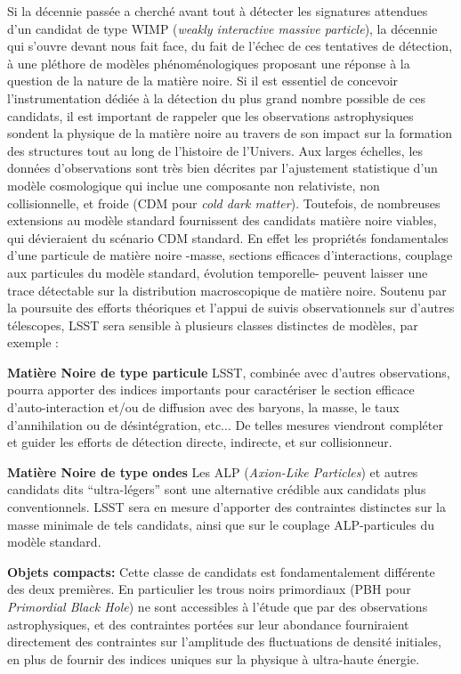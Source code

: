 \documentclass[12pt]{article}
\begin{document}
Si la décennie passée a cherché avant tout à détecter les signatures attendues d'un candidat de type WIMP ({\it weakly interactive massive particle}), la décennie qui s'ouvre devant nous fait face, du fait de l'échec de ces tentatives de détection, à une pléthore de modèles phénoménologiques proposant une réponse à la question de la nature de la matière noire. Si il est essentiel de concevoir l'instrumentation dédiée à la détection du plus grand nombre possible de ces candidats, il est important de rappeler que les observations astrophysiques sondent la physique de la matière noire au travers de son impact sur la formation des structures tout au long de l'histoire de l'Univers. Aux larges échelles, les données d'observations sont très bien décrites par l'ajustement statistique d'un modèle cosmologique qui inclue une composante non relativiste, non collisionnelle, et froide (CDM pour {\it cold dark matter}). Toutefois, de nombreuses extensions au modèle standard fournissent des candidats matière noire viables, qui dévieraient du scénario CDM standard. En effet les propriétés fondamentales d'une particule de matière noire -masse, sections efficaces d'interactions, couplage aux particules du modèle standard, évolution temporelle- peuvent laisser une trace détectable sur la distribution macroscopique de matière noire. Soutenu par la poursuite des efforts théoriques et l'appui de suivis observationnels sur d'autres télescopes, LSST sera sensible à plusieurs classes distinctes de modèles, par exemple :

\noindent \textbf{Matière Noire de type particule} LSST, combinée avec d'autres observations, pourra apporter des indices importants pour caractériser le section efficace d'auto-interaction et/ou de diffusion avec des baryons, la masse, le taux d'annihilation ou de désintégration, etc... De telles mesures viendront compléter et guider les efforts de détection directe, indirecte, et sur collisionneur.

\noindent \textbf{Matière Noire de type ondes} Les ALP ({\it Axion-Like Particles}) et autres candidats dits ``ultra-légers'' sont une alternative crédible aux candidats plus conventionnels. LSST sera en mesure d'apporter des contraintes distinctes sur la masse minimale de tels candidats, ainsi que sur le couplage ALP-particules du modèle standard.

\noindent \textbf{Objets compacts:} Cette classe de candidats est fondamentalement différente des deux premières. En particulier les trous noirs primordiaux (PBH pour {\it Primordial Black Hole}) ne sont accessibles à l'étude que par des observations astrophysiques, et des contraintes portées sur leur abondance fourniraient directement des contraintes sur l'amplitude des fluctuations de densité initiales, en plus de fournir des indices uniques sur la physique à ultra-haute énergie.
\end{document}
